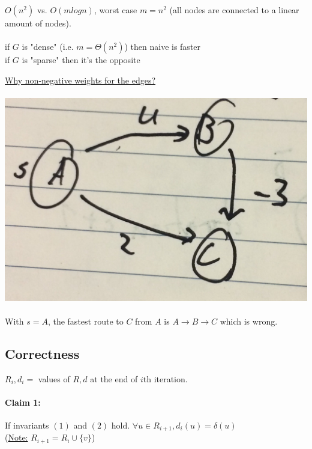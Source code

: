 \documentclass[12pt]{article}
\begin{document}
$O(n^2)$ vs. $O(mlogn)$, worst case $m = n^2$ (all nodes are connected to a linear amount of nodes).\\
\\
if $G$ is "dense" (i.e. $m = \Theta (n^2)$) then naive is faster\\
if $G$ is "sparse" then it's the opposite

\underline{Why non-negative weights for the edges?}\\
\\
\includegraphics[scale=0.25]{lec3-1}
\\
\\
With $s = A$, the fastest route to $C$ from $A$ is $A \rightarrow B \rightarrow C$ which is wrong.

\subsection{Correctness}

$R_i, d_i = $ values of $R,d$ at the end of $i$th iteration.

\paragraph{Claim 1:} If invariants $(1)$ and $(2)$ hold. $\forall u \in R_{i+1}, d_i (u) = \delta (u)$\\
(\underline{Note:} $R_{i+1} = R_i \cup \{ v \}$)
\end{document}
